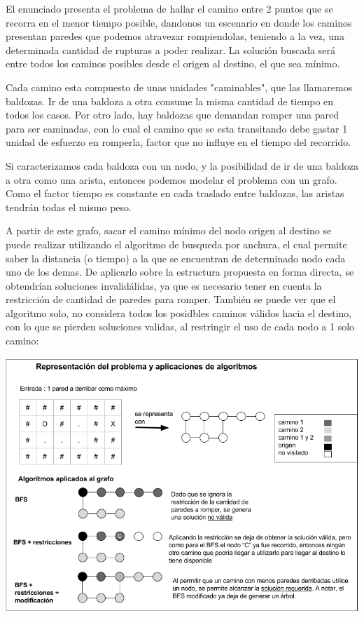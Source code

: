 El enunciado presenta el problema de hallar el camino entre 2 puntos que se recorra en el menor tiempo posible, dandonos un escenario en donde los caminos presentan paredes que podemos atravezar rompiendolas, teniendo a la vez, una determinada cantidad de rupturas a poder realizar. La solución buscada será entre todos los caminos posibles desde el origen al destino, el que sea mínimo.

Cada camino esta compuesto de unas unidades "caminables", que las llamaremos baldozas. Ir de una baldoza a otra consume la misma cantidad de tiempo en todos los casos. Por otro lado, hay 
baldozas que demandan romper una pared para ser caminadas, con lo cual el camino que se esta transitando debe gastar 1 unidad de esfuerzo en romperla, factor que no influye en el tiempo del recorrido.

Si caracterizamos cada baldoza con un nodo, y la posibilidad de ir de una baldoza a otra como una arista, entonces podemos modelar el problema con un grafo. Como el factor tiempo es constante en cada traslado entre baldozas, las aristas tendrán todas el mismo peso.

A partir de este grafo, sacar el camino mínimo del nodo origen al destino se puede realizar utilizando el algoritmo de busqueda por anchura, el cual permite saber la distancia (o tiempo) a la que se encuentran de determinado nodo cada uno de los demas. De aplicarlo sobre la estructura propuesta en forma directa, se obtendrían soluciones invalidálidas, ya que es necesario tener en cuenta la restricción de cantidad de paredes para romper. También se puede ver que el algoritmo solo, no considera todos los posidbles caminos válidos hacia el destino, con lo que se pierden soluciones validas, al restringir el uso de cada nodo a 1 solo camino:

  \vspace*{0.3cm} \vspace*{0.3cm}
  \begin{center}
 \includegraphics[scale=0.6]{./EJ1/ej1-explicacion.png}
  \end{center}
  \vspace*{0.3cm}

